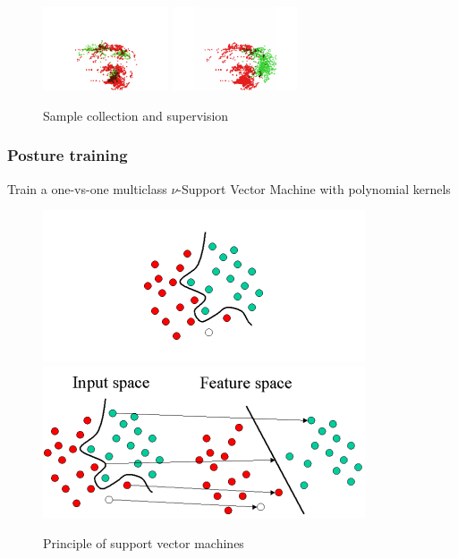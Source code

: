 \documentclass{beamer}
\begin{document}
\begin{frame}
\begin{figure}
			\includegraphics[width=0.33\textwidth]{images/allsamples-point-zoom} \hspace*{0.2cm}
			\includegraphics[width=0.33\textwidth]{images/allsamples-point-right} 
			\caption{Sample collection and supervision}
		\end{figure}
		
	\end{frame}
	\begin{frame}
		\frametitle{Posture training}
		Train a one-vs-one multiclass $\nu$-Support Vector Machine with polynomial kernels
		\begin{figure}
			\hspace*{-3cm}
			\includegraphics[scale=0.5]{images/svm1}\hspace*{-1cm}
			\includegraphics[scale=0.5]{images/svm2}
			\caption{Principle of support vector machines}
		\end{figure}
	\end{frame}
\end{document}
